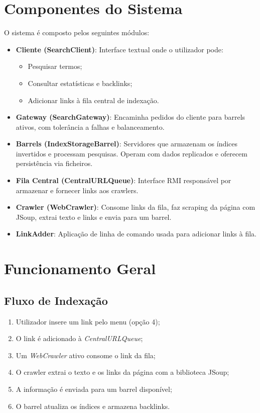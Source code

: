 \documentclass{article}
\begin{document}
\newpage

\section{Componentes do Sistema}
O sistema é composto pelos seguintes módulos:

\begin{itemize}
    \item \textbf{Cliente (SearchClient)}: Interface textual onde o utilizador pode:
    \begin{itemize}
        \item Pesquisar termos;
        \item Consultar estatísticas e backlinks;
        \item Adicionar links à fila central de indexação.
    \end{itemize}

    \item \textbf{Gateway (SearchGateway)}: Encaminha pedidos do cliente para barrels ativos, com tolerância a falhas e balanceamento.

    \item \textbf{Barrels (IndexStorageBarrel)}: Servidores que armazenam os índices invertidos e processam pesquisas. Operam com dados replicados e oferecem persistência via ficheiros.

    \item \textbf{Fila Central (CentralURLQueue)}: Interface RMI responsável por armazenar e fornecer links aos crawlers.

    \item \textbf{Crawler (WebCrawler)}: Consome links da fila, faz scraping da página com JSoup, extrai texto e links e envia para um barrel.

    \item \textbf{LinkAdder}: Aplicação de linha de comando usada para adicionar links à fila.
\end{itemize}

\newpage

\section{Funcionamento Geral}

\subsection{Fluxo de Indexação}
\begin{enumerate}
    \item Utilizador insere um link pelo menu (opção 4);
    \item O link é adicionado à \textit{CentralURLQueue};
    \item Um \textit{WebCrawler} ativo consome o link da fila;
    \item O crawler extrai o texto e os links da página com a biblioteca JSoup;
    \item A informação é enviada para um barrel disponível;
    \item O barrel atualiza os índices e armazena backlinks.
\end{enumerate}
\end{document}
